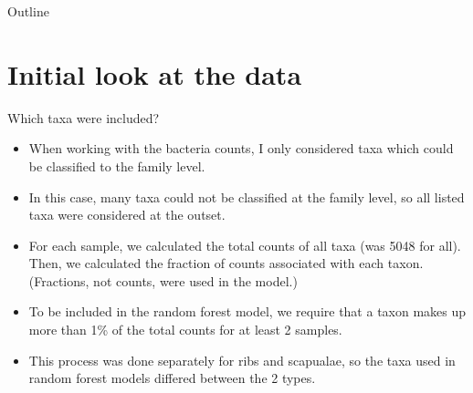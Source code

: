 \documentclass{beamer}
\date{Feb.\ 2020}
\begin{document}

\begin{frame}{Outline}
  \tableofcontents
\end{frame}








\section[Initial look]{Initial look at the data}


\begin{frame}{Which taxa were included?}

  {\footnotesize
    \begin{itemize}
    \item When working with the bacteria counts, I only considered
      taxa which could be classified to the family level.
    \item In this case, many taxa could not be classified at the
      family level, so all listed taxa were considered at the outset.
    \item For each sample, we calculated the total counts of all taxa
      (was 5048 for all).  Then, we calculated the fraction of counts
      associated with each taxon.  (Fractions, not counts, were used
      in the model.)
    \item To be included in the random forest model, we require that
      a taxon makes up more than 1\% of the total counts for at least
      2 samples.
     \item This process was done separately for ribs and scapualae, so
       the taxa used in random forest models differed between the 2
       types.
    \end{itemize}
  }
  
\end{frame}
\end{document}
